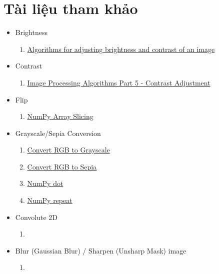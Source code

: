\documentclass{article}
\begin{document}
\section{Tài liệu tham khảo}
\begin{itemize}
  \item Brightness
  \begin{enumerate}
    \item \href{https://ie.nitk.ac.in/blog/2020/01/19/algorithms-for-adjusting-brightness-and-contrast-of-an-image/}{Algorithms for adjusting brightness and contrast of an image}
  \end{enumerate}
  \item Contrast
  \begin{enumerate}
      \item \href{https://www.dfstudios.co.uk/articles/programming/image-programming-algorithms/image-processing-algorithms-part-5-contrast-adjustment/}{Image Processing Algorithms Part 5 - Contrast Adjustment}
  \end{enumerate}
  \item Flip
  \begin{enumerate}
      \item \href{https://www.w3schools.com/python/numpy/numpy_array_slicing.asp}{NumPy Array Slicing}
  \end{enumerate}
  \item Grayscale/Sepia Conversion
  \begin{enumerate}
    \item \href{https://www.tutorialspoint.com/dip/grayscale_to_rgb_conversion.htm}{Convert RGB to Grayscale}
    \item \href{https://www.geeksforgeeks.org/image-processing-in-java-colored-image-to-sepia-image-conversion/}{Convert RGB to Sepia}
    \item \href{https://numpy.org/doc/stable/reference/generated/numpy.dot.html}{NumPy dot}
    \item \href{https://numpy.org/doc/stable/reference/generated/numpy.repeat.html}{NumPy repeat}
  \end{enumerate}
  \item Convolute 2D
  \begin{enumerate}
    \item 
  \end{enumerate}
  \item Blur (Gaussian Blur) / Sharpen (Unsharp Mask) image
  \begin{enumerate}
    \item 

\end{enumerate}
\end{itemize}
\end{document}
